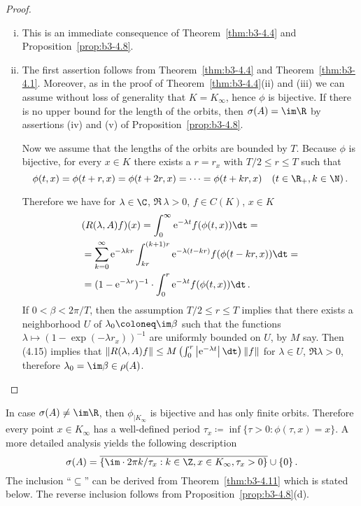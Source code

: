 \begin{proof}
\begin{enumerate}[(i), wide]%
\item 
	This is an immediate consequence of Theorem~\ref{thm:b3-4.4} and Proposition~\ref{prop:b3-4.8}.
	
\item 
	The first assertion follows from Theorem~\ref{thm:b3-4.4} and Theorem~\ref{thm:b3-4.1}.
	Moreover, as in the proof of Theorem~\ref{thm:b3-4.4}(ii) and (iii) we can assume without loss of generality that $K = K_{\infty}$, hence $\phi$ is bijective.
	If there is no upper bound for the length of the orbits, then $\sigma(A) = \im\R$ by assertions (iv) and (v) of Proposition~\ref{prop:b3-4.8}.
	
	Now we assume that the lengths of the orbits are bounded by $T$.
	Because $\phi$ is bijective, for every $x \in K$ there exists a $r = r_{x}$ with $T/2 \leq r \leq T$ such that 
	\[
	\phi(t,x) = \phi(t+r,x) = \phi(t+2r,x) = \cdots = \phi(t+kr,x) \quad (t \in \R_{+}, k \in \N)\,.
	\]
	
	Therefore we have for $\lambda \in \C$, $\Re\,\lambda  > 0$, $f \in C(K)$, $x \in K$
	\begin{equation}\label{eq:b3-4.15}
		\begin{aligned}
			&(R(\lambda,A)f)(x) = \int_{0}^{\infty} \mathrm{e}^{-\lambda t}f(\phi(t,x)) \dt = \\
			&= \sum_{k=0}^{\infty} \mathrm{e}^{-\lambda kr}\int_{kr}^{(k+1)r} \mathrm{e}^{-\lambda(t-kr)} f(\phi(t-kr,x)) \dt =  \\
			&= (1 - \mathrm{e}^{-\lambda r})^{-1}\cdot\int_{0}^{r} \mathrm{e}^{-\lambda t} f(\phi(t,x)) \dt\,.
		\end{aligned}
	\end{equation}
	If $0 < \beta < 2\pi/T$, then the assumption $T/2 \leq r \leq T$ implies that there exists a neighborhood $U$ of $\lambda_{0} \coloneq \im\beta$ such that the functions $\lambda \mapsto (1 - \exp(-\lambda r_{x}))^{-1}$ are uniformly bounded on $U$, by $M$ say.
	Then (4.15) implies that $\|R(\lambda,A)f\| \leq M\left(\int_{0}^{r} \left|\mathrm{e}^{-\lambda t}\right|\dt\right)\|f\|$ for $\lambda \in U$, $\Re\lambda > 0$, therefore $\lambda_{0} = \im\beta \in \rho(A)$.
\end{enumerate}
\end{proof}
\begin{remark}\label{rem:b3-4.10}
	In case $\sigma(A) \neq \im\R$, then $\phi_{|K_{\infty}}$ is bijective and has only finite orbits.
	Therefore every point $x \in K_{\infty}$ has a well-defined period $\tau_{x} \coloneq \inf\{\tau > 0 : \phi(\tau,x) = x\}$.
	A more detailed analysis yields the following description 
	\begin{equation}\label{eq:b3-4.16}
		\sigma(A) = \overline{\{\im \cdot 2\pi k/\tau_{x} : k \in \Z, x \in K_{\infty}, \tau_{x} > 0\}} \cup \{0\}\,.
	\end{equation}
	The inclusion \enquote{$\subseteq$} can be derived from Theorem~\ref{thm:b3-4.11} which is stated below.
	The reverse inclusion follows from Proposition~\ref{prop:b3-4.8}(d).
\end{remark}
	
